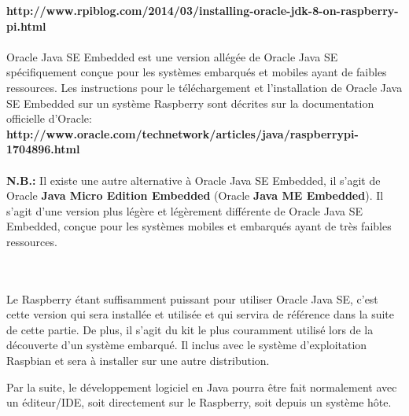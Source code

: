 \documentclass{article}
\begin{document}
\textbf{http://www.rpiblog.com/2014/03/installing-oracle-jdk-8-on-raspberry-pi.html}
\\
\\
Oracle Java SE Embedded est une version allégée de Oracle Java SE spécifiquement conçue pour les systèmes embarqués et mobiles ayant de faibles ressources.
Les instructions pour le téléchargement et l’installation de Oracle Java SE Embedded sur un système Raspberry sont décrites sur la documentation officielle d’Oracle:\\
\textbf{http://www.oracle.com/technetwork/articles/java/raspberrypi-1704896.html}
\\
\\
\textbf{N.B.:} Il existe une autre alternative à Oracle Java SE Embedded, il s’agit de Oracle \textbf{Java Micro Edition Embedded} (Oracle \textbf{Java ME Embedded}). Il s’agit d’une version plus légère et légèrement différente de Oracle Java SE Embedded, conçue pour les systèmes mobiles et embarqués ayant de très faibles ressources. 

\\
\\
Le Raspberry étant suffisamment puissant pour utiliser Oracle Java SE, c’est cette version qui sera installée et utilisée et qui servira de référence dans la suite de cette partie. De plus, il s’agit du kit le plus couramment utilisé lors de la découverte d’un système embarqué.
Il inclus avec le système d’exploitation Raspbian et sera à installer sur une autre distribution.

Par la suite, le développement logiciel en Java pourra être fait normalement avec un éditeur/IDE, soit directement sur le Raspberry, soit depuis un système hôte.
\end{document}
